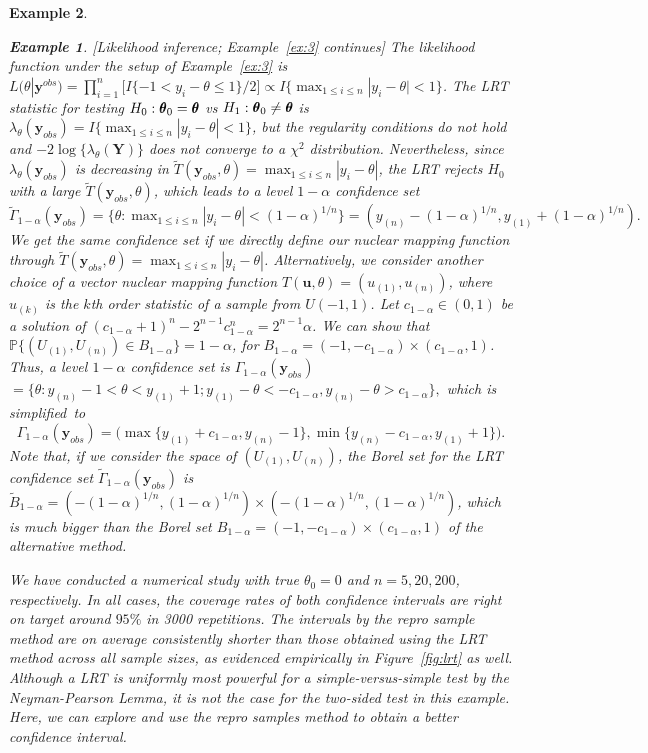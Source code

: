 \documentclass[12pt]{article}
\theoremstyle{shortspace}
\newtheorem{example}{\quad Example}
\def\*#1{\bm{#1}}
\def\btheta{\mathop{\theta\kern-.45em\hbox{$\theta$}}\nolimits}
\def\P{\mathbb P}
\begin{document}
\begin{example}
\begin{example}\label{ex:3a}
[Likelihood inference; Example~\ref{ex:3} continues] 
The likelihood function under the setup of Example~\ref{ex:3} is
$L(\theta|\*y^{obs}) = \prod\nolimits_{i =1}^n
    \big[ I\{-1 < y_i - \theta \leq 1\}/2\big] 
    \propto I\big\{ \max\nolimits_{1\leq i \leq n}|y_i - \theta| < 1 \big\}
$. The LRT statistic for testing $H_0: \btheta_0 = \btheta$ vs $H_1: \btheta_0 \not = \btheta$ is 
$\lambda_{\theta}(\*y_{obs}) 
= I\big\{ \max\nolimits_{1 \leq i \leq n}|y_i - \theta| < 1 \big\}$, but the regularity conditions do not hold and $-2 \log\{\lambda_{\theta}(\*Y)\}$ 
does not converge to a $\chi^2$ distribution. 
Nevertheless, since $\lambda_{\theta}(\*y_{obs})$ is 
decreasing in $\widetilde T(\*y_{obs}, \theta) = \max\nolimits_{1 \leq i \leq n}|y_i - \theta|$, the LRT rejects $H_0$ with a large $\widetilde T(\*y_{obs}, \theta)$, which leads to 
a level $1 - \alpha$ confidence set $$\widetilde \Gamma_{1-\alpha}(\*y_{obs}) = \{\theta: \max\nolimits_{1 \leq i \leq n} |y_i - \theta| < (1-\alpha)^{1/n}\} 
=  (y_{(n)} - (1-\alpha)^{1/n}, y_{(1)} + (1-\alpha)^{1/n}).$$ 
We get the same confidence set if we 
directly define our nuclear mapping function through $\widetilde T(\*y_{obs}, \theta) =  \max\nolimits_{1 \leq i \leq n} |y_i - \theta|$. Alternatively, 
we consider another choice 
of 
a vector nuclear mapping function $T(\*u, \theta) = (u_{(1)}, u_{(n)})$,
where $u_{(k)}$ is the $k$th order statistic of a sample from $U(-1,1)$. 
Let $c_{1-\alpha} \in (0,1)$ be a solution of
$({c_{1-\alpha}+1})^n - 2^{n-1}c_{1-\alpha}^n = 2^{n-1}\alpha$. We can show that $\P\{(U_{(1)}, U_{(n)}) \in B_{1 -\alpha}\} = 1- \alpha$, for $B_{1 -\alpha} = (-1, -c_{1-\alpha}) \times (c_{1-\alpha}, 1)$. Thus, a level $1 - \alpha$ confidence set is $\Gamma_{1-\alpha}(\*y_{obs})$ $ = \{\theta: y_{(n)} - 1 < \theta < y_{(1)} + 1; 
 y_{(1)} - \theta < -c_{1-\alpha}, y_{(n)} - \theta > c_{1-\alpha}\},
 $
 which is simplified~to $$\Gamma_{1-\alpha}(\*y_{obs})
= \big(\max\big\{y_{(1)} + c_{1-\alpha}, y_{(n)} - 1\big\}, \min\big\{y_{(n)} - c_{1-\alpha}, y_{(1)} + 1\big\}\big).$$ 
Note that, if we consider the space of $(U_{(1)} , U_{(n)})$, the
Borel set for the LRT confidence set $\widetilde \Gamma_{1-\alpha}(\*y_{obs})$ is $\widetilde B_{1 -\alpha} = (- (1-\alpha)^{1/n}, (1-\alpha)^{1/n}) \times (- (1-\alpha)^{1/n}, (1-\alpha)^{1/n})$, which is much bigger than the Borel set $B_{1 -\alpha} = (-1, -c_{1-\alpha}) \times (c_{1-\alpha}, 1)$ of the alternative method. 

We have conducted a numerical study with true $\theta_0 = 0$ and $n = 5, 20, 200$, respectively. In all cases, the coverage rates of both confidence intervals are right on target around $95\%$ in 3000 repetitions.  
The intervals by the repro sample method are on average consistently shorter than those obtained using the LRT method across all sample sizes, as evidenced empirically in Figure~\ref{fig:lrt} as well. 
Although a LRT is uniformly most powerful for a simple-versus-simple test by the Neyman-Pearson Lemma, it is not the case for the two-sided test in this example.  Here, we can explore and use the repro samples method to obtain a better confidence interval.   
\end{example}


\end{example}
\end{document}
